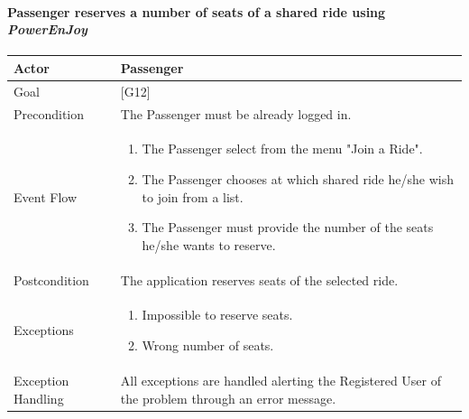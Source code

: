 \documentclass{article}
\newcommand{\pej}{\mbox{\normalfont\itshape PowerEnJoy }}
\begin{document}
		\paragraph{Passenger reserves a number of seats of a shared ride using \pej}
		\begin{center}
			\begin{tabular}{| l | p{9cm} |}\hline
				Actor & Passenger\\\hline
				Goal & {[}G12{]} \\\hline
				Precondition & The Passenger must be already logged in.\\\hline
				Event Flow & \begin{enumerate}
					\item The Passenger select from the menu "Join a Ride".
					\item The Passenger chooses at which shared ride he/she wish to join from a list.
					\item The Passenger must provide the number of the seats he/she wants to reserve.
				\end{enumerate}\\\hline
				Postcondition & The application reserves seats of the selected ride.\\\hline
				Exceptions & \begin{enumerate}
					\item Impossible to reserve seats.
					\item Wrong number of seats.
				\end{enumerate}\\\hline
				Exception Handling&All exceptions are handled alerting the Registered User of the
				problem through an error message.\\\hline
			\end{tabular}
		\end{center}
\end{document}
